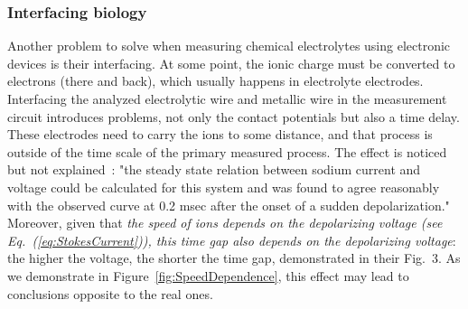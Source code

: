 \subsubsection{Interfacing biology}{\label{Physics-Interfacing}}
Another problem to solve when measuring chemical electrolytes
using electronic devices is their interfacing. At some point, the
ionic charge must be converted to electrons (there and back), which
usually happens in electrolyte electrodes. Interfacing the analyzed
electrolytic wire and metallic wire in the measurement circuit introduces
problems, not only the contact potentials but also a %
{time delay}. 
These electrodes need to
carry the ions to some distance, and that process is outside of the
time scale of the primary measured process. The effect is noticed
but not explained~\cite{HodgkinHuxley:1952}: "the steady state
relation between sodium current and voltage could be calculated for
this system and was found to agree reasonably with the observed curve
at 0.2 msec after the onset of a sudden depolarization." Moreover,
given that \textit{the speed of ions depends on the depolarizing voltage (see
	Eq.~(\ref{eq:StokesCurrent})), this time gap also depends on the depolarizing
	voltage}: the higher the voltage, the shorter the time gap, demonstrated
in their Fig.~3. As we demonstrate in Figure~\ref{fig:SpeedDependence},
this effect may lead to conclusions opposite to the real ones.
